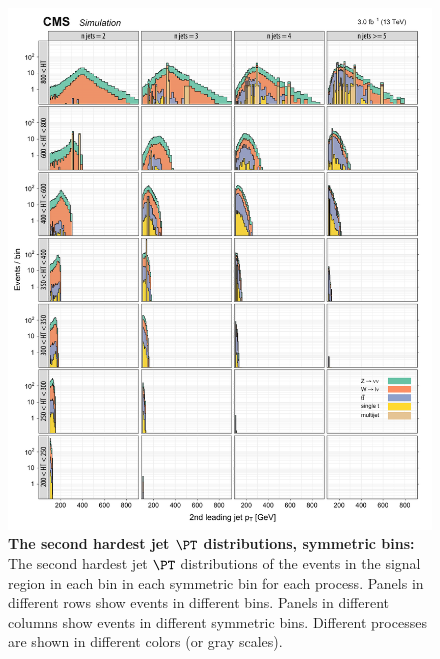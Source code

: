 \begin{figure}[!h]
\centering
\includegraphics[scale=0.95]{figures/kiplots/c150107_s150318_f015_jet_pt_1_100}
\caption{\textbf{\boldmath The second hardest jet $\PT$ distributions,
symmetric \njet bins:} The second hardest jet $\PT$ distributions of the
events in the signal region in each \scalht bin in each symmetric \njet
bin for each process. Panels in different rows show events in different
\scalht bins. Panels in different columns show events in different
symmetric \njet bins. Different processes are shown in different colors
(or gray scales).} \label{c150107_s150318_f015_jet_pt_1_100}
\end{figure}

